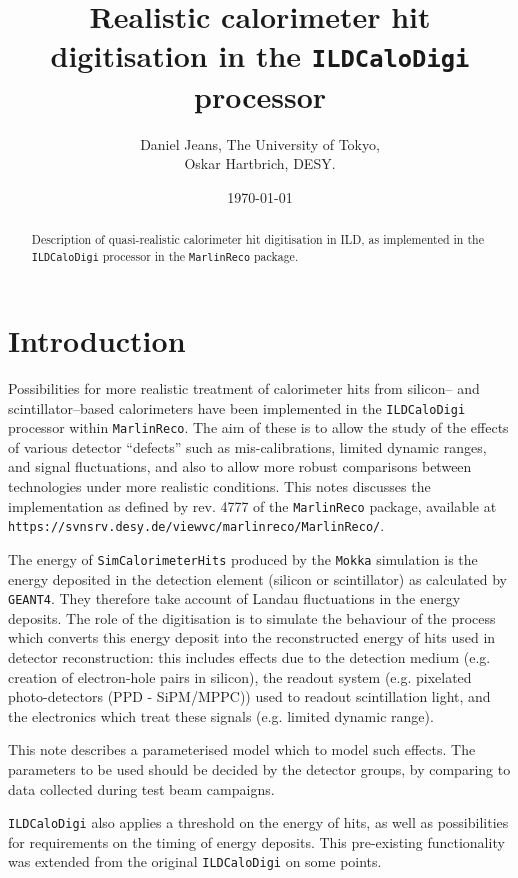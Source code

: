 \documentclass[12pt]{article} %
\title{Realistic calorimeter hit digitisation in the {\tt ILDCaloDigi} processor}
\author{Daniel Jeans, The University of Tokyo,\\
Oskar Hartbrich, DESY.
}
\date{\today}
\begin{document}
\maketitle

\begin{abstract}

Description of quasi-realistic calorimeter hit digitisation in ILD, as implemented in
the {\tt ILDCaloDigi} processor in the {\tt MarlinReco} package.

\end{abstract}


\section{Introduction}

Possibilities for more realistic treatment of calorimeter hits from silicon-- and scintillator--based calorimeters have been 
implemented in the {\tt ILDCaloDigi} processor within {\tt MarlinReco}. The aim of these is to allow the study of the effects 
of various detector ``defects'' such as mis-calibrations, limited dynamic ranges, and signal fluctuations, 
and also to allow more robust comparisons between technologies under more realistic conditions.
This notes discusses the implementation as defined by rev. 4777 of the {\tt MarlinReco} package, available at
{\tt https://svnsrv.desy.de/viewvc/marlinreco/MarlinReco/}.

The energy of {\tt SimCalorimeterHits} produced by the {\tt Mokka} simulation is the energy deposited in the detection
element (silicon or scintillator) as calculated by {\tt GEANT4}. They therefore take account of Landau fluctuations
in the energy deposits.
The role of the digitisation is to simulate the behaviour of the process which converts this energy deposit into the 
reconstructed energy of hits used in detector reconstruction: this includes effects due to the detection medium
(e.g. creation of electron-hole pairs in silicon), 
the readout system (e.g. pixelated photo-detectors (PPD - SiPM/MPPC)) used to readout scintillation light,
and the electronics which treat these signals (e.g. limited dynamic range).

This note describes a parameterised model which to model such effects. The parameters to be used should be decided by
the detector groups, by comparing to data collected during test beam campaigns.

{\tt ILDCaloDigi} also applies a threshold on the energy of hits, as well as possibilities for requirements on the timing
of energy deposits. This pre-existing functionality was extended from the original {\tt ILDCaloDigi} on some points.
\end{document}
